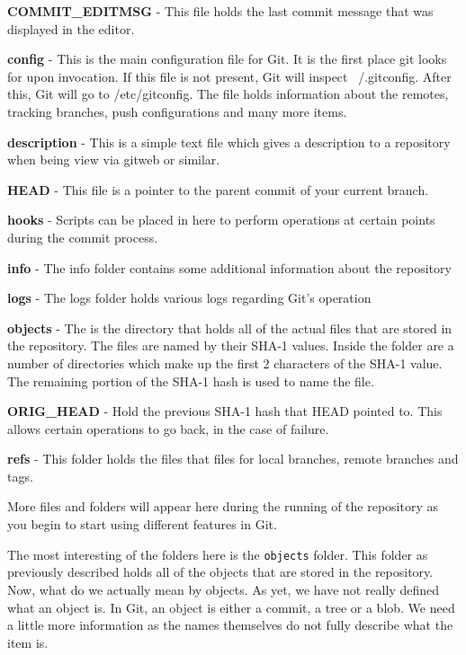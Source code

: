 \textbf{COMMIT\_EDITMSG} - This file holds the last commit message that was displayed in the editor.

\textbf{config} - This is the main configuration file for Git.  It is the first place git looks for upon invocation.  If this file is not present, Git will inspect ~/.gitconfig.  After this, Git will go to /etc/gitconfig.  The file holds information about the remotes, tracking branches, push configurations and many more items.

\textbf{description} - This is a simple text file which gives a description to a repository when being view via gitweb or similar.

\textbf{HEAD} - This file is a pointer to the parent commit of your current branch.

\textbf{hooks} - Scripts can be placed in here to perform operations at certain points during the commit process.

\textbf{info} - The info folder contains some additional information about the repository

\textbf{logs} - The logs folder holds various logs regarding Git's operation

\textbf{objects} - The is the directory that holds all of the actual files that are stored in the repository.  The files are named by their SHA-1 values.  Inside the folder are a number of directories which make up the first 2 characters of the SHA-1 value.  The remaining portion of the SHA-1 hash is used to name the file.

\textbf{ORIG\_HEAD} - Hold the previous SHA-1 hash that HEAD pointed to.  This allows certain operations to go back, in the case of failure.

\textbf{refs} - This folder holds the files that files for local branches, remote branches and tags.

More files and folders will appear here during the running of the repository as you begin to start using different features in Git.

The most interesting of the folders here is the \texttt{objects} folder.  This folder as previously described holds all of the objects that are stored in the repository.  Now, what do we actually mean by objects.  As yet, we have not really defined what an object is.  In Git, an object is either a commit, a tree or a blob.  We need a little more information as the names themselves do not fully describe what the item is.

